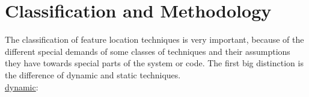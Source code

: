 \chapter{Classification and Methodology}
\label{ch:Classification and Methodology}

The classification of feature location techniques is very important, because of the different special demands of some classes of techniques and their assumptions they have towards special parts of the system or code.
The first big distinction is the difference of dynamic and static techniques. \newline
\\
\underline{dynamic}:\newline
